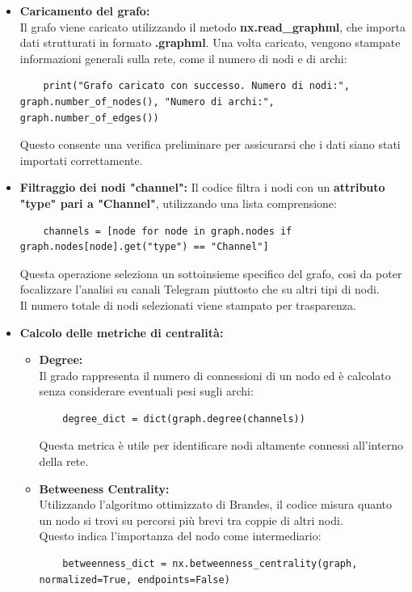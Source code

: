 \documentclass[12pt]{article}
\begin{document}
	\begin{itemize}[label=] 
		\item \textbf{Caricamento del grafo:}\\
		Il grafo viene caricato utilizzando il metodo \textbf{nx.read\_graphml}, che importa dati strutturati in formato \textbf{.graphml}. Una volta caricato, vengono stampate informazioni generali sulla rete, come il numero di nodi e di archi:
		\begin{lstlisting}
	print("Grafo caricato con successo. Numero di nodi:", graph.number_of_nodes(), "Numero di archi:", graph.number_of_edges())
		\end{lstlisting}
		Questo consente una verifica preliminare per assicurarsi che i dati siano stati importati correttamente.
		\item \textbf{Filtraggio dei nodi "channel":}
		Il codice filtra i nodi con un \textbf{attributo "type" pari a "Channel"}, utilizzando una lista comprensione:
		\begin{lstlisting}
	channels = [node for node in graph.nodes if graph.nodes[node].get("type") == "Channel"]
		\end{lstlisting}
		Questa operazione seleziona un sottoinsieme specifico del grafo, cosi da poter focalizzare l'analisi su canali Telegram piuttosto che su altri tipi di nodi. \\Il numero totale di nodi selezionati viene stampato per trasparenza.
		\item \textbf{Calcolo delle metriche di centralità:}
		\begin{itemize}
			\item \textbf{Degree:}\\
			Il grado rappresenta il numero di connessioni di un nodo ed è calcolato senza considerare eventuali pesi sugli archi:
			\begin{lstlisting}
	degree_dict = dict(graph.degree(channels))
			\end{lstlisting}
			Questa metrica è utile per identificare nodi altamente connessi all'interno della rete.
			\item \textbf{Betweeness Centrality:}\\
			Utilizzando l'algoritmo ottimizzato di Brandes, il codice misura quanto un nodo si trovi su percorsi più brevi tra coppie di altri nodi.\\ Questo indica l'importanza del nodo come intermediario:
			\begin{lstlisting}
	betweenness_dict = nx.betweenness_centrality(graph, normalized=True, endpoints=False)

\end{lstlisting}
\end{itemize}
\end{itemize}
\end{document}
